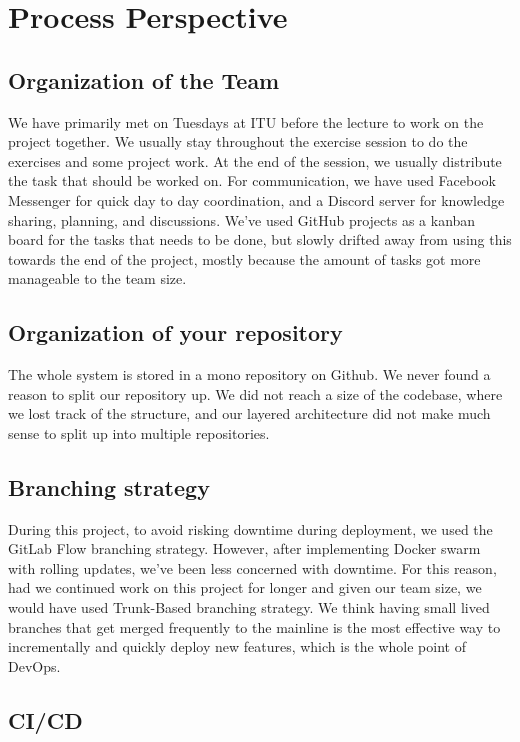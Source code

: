 \section{Process Perspective}

\subsection{Organization of the Team}
We have primarily met on Tuesdays at ITU before the lecture to work on the project together. We usually stay throughout the exercise session to do the exercises and some project work. At the end of the session, we usually distribute the task that should be worked on. For communication, we have used Facebook Messenger for quick day to day coordination, and a Discord server for knowledge sharing, planning, and discussions.
We've used GitHub projects as a kanban board for the tasks that needs to be done, but slowly drifted away from using this towards the end of the project, mostly because the amount of tasks got more manageable to the team size. 


\subsection{Organization of your repository}
The whole system is stored in a mono repository on Github. We never found a reason to split our repository up. We did not reach a size of the codebase, where we lost track of the structure, and our layered architecture did not make much sense to split up into multiple repositories.


\subsection{Branching strategy}
During this project, to avoid risking downtime during deployment, we used the GitLab Flow branching strategy. However, after implementing Docker swarm with rolling updates, we've been less concerned with downtime. For this reason, had we continued work on this project for
longer and given our team size, we would have used Trunk-Based branching strategy. We think having small lived branches that get merged frequently to the mainline is the most effective way to incrementally and quickly deploy new features, which is the whole point of DevOps.


\subsection{CI/CD}

